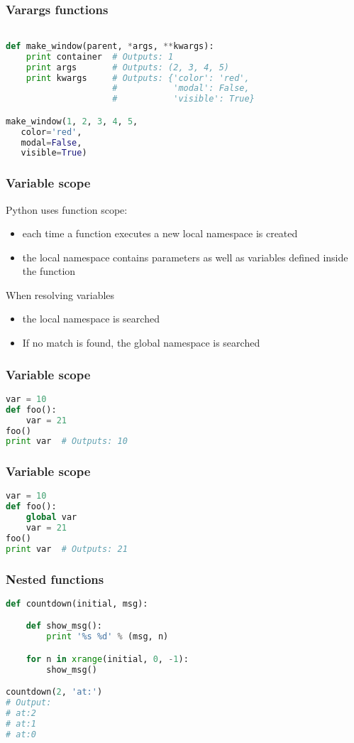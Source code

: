\documentclass{beamer}
\begin{document}
\begin{frame}[fragile]
\frametitle{Varargs functions}

\begin{lstlisting}[language=python]

def make_window(parent, *args, **kwargs):
    print container  # Outputs: 1
    print args       # Outputs: (2, 3, 4, 5)
    print kwargs     # Outputs: {'color': 'red', 
                     #           'modal': False,
                     #           'visible': True}

make_window(1, 2, 3, 4, 5,
   color='red',
   modal=False,
   visible=True)

\end{lstlisting}
\end{frame}

\begin{frame}[fragile]
\frametitle{Variable scope}
Python uses function scope:
\begin{itemize}
 \item each time a function executes a new local namespace is created
 \item the local namespace contains parameters as well as variables defined inside the function
\end{itemize}
\vspace{5 mm}
When resolving variables
\begin{itemize}
  \item the local namespace is searched
  \item If no match is found, the global namespace is searched  
\end{itemize}

\end{frame}

\begin{frame}[fragile]
\frametitle{Variable scope}
\begin{lstlisting}[language=python]
var = 10
def foo():
    var = 21
foo()
print var  # Outputs: 10
\end{lstlisting}
\end{frame}

\begin{frame}[fragile]
\frametitle{Variable scope}
\begin{lstlisting}[language=python]
var = 10
def foo():
    global var
    var = 21
foo()
print var  # Outputs: 21
\end{lstlisting}
\end{frame}

\begin{frame}[fragile]
\frametitle{Nested functions}
\begin{lstlisting}[language=python]
def countdown(initial, msg):

    def show_msg():
        print '%s %d' % (msg, n)

    for n in xrange(initial, 0, -1):
        show_msg()

countdown(2, 'at:')
# Output:
# at:2
# at:1
# at:0
\end{lstlisting}
\end{frame}
\end{document}
